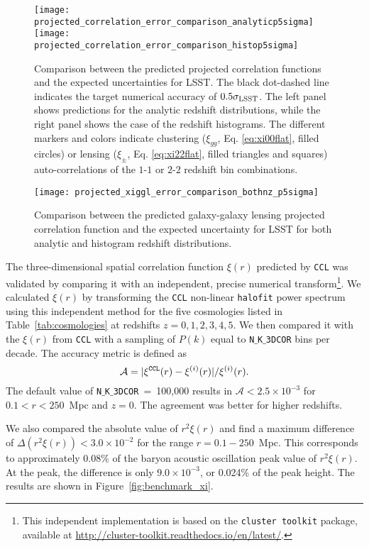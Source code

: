 \documentclass[\docopts]{\docclass}
\newcommand{\ccl}{{\tt CCL}\xspace}
\newcommand{\halofit}{{\tt halofit}\xspace}
\begin{document}
\begin{figure*}
\centering
\texttt{[image: projected\_correlation\_error\_comparison\_analyticp5sigma]} 
\texttt{[image: projected\_correlation\_error\_comparison\_histop5sigma]} 
\caption{Comparison between the predicted projected correlation functions and the expected uncertainties for LSST. The black dot-dashed line indicates the target numerical accuracy of $0.5\sigma_{\rm LSST}$. The left panel shows predictions for the analytic redshift distributions, while the right panel shows the case of the redshift histograms. The different markers and colors indicate clustering ($\xi_{gg}$, Eq. \ref{eq:xi00flat}, filled circles) or lensing ($\xi_{\pm}$, Eq. \ref{eq:xi22flat}, filled triangles and squares) auto-correlations of the $1$-$1$ or $2$-$2$ redshift bin combinations.}
\label{fig:corrval}
\end{figure*}
\begin{figure}
\centering
\texttt{[image: projected\_xiggl\_error\_comparison\_bothnz\_p5sigma]}
\caption{Comparison between the predicted galaxy-galaxy lensing projected correlation function and the expected uncertainty for LSST for both analytic and histogram redshift distributions.}
\label{fig:corrval2}
\end{figure}

The three-dimensional spatial correlation function $\xi(r)$ predicted by \ccl was validated by comparing it with an independent, precise numerical transform\footnote{This independent implementation is based on the {\tt cluster toolkit} package, available at \url{http://cluster-toolkit.readthedocs.io/en/latest/}.}. We calculated $\xi(r)$  by transforming the \ccl non-linear \halofit power spectrum using this independent method for the five cosmologies listed in Table~\ref{tab:cosmologies} at redshifts $z = 0,1,2,3,4,5$.  We then compared it with the $\xi(r)$ from \ccl with a sampling of $P(k)$ equal to {\tt N$\_$K$\_$3DCOR} bins per decade. The accuracy metric is defined as
\begin{equation}
	\mathcal{A}=|\xi^{\tt CCL}(r)-\xi^{(i)}(r)| / \xi^{(i)}(r).
  \label{eq:accxi}
\end{equation}
The default value of {\tt N$\_$K$\_$3DCOR}~=~100,000 results in $\mathcal{A} < 2.5 \times 10^{-3}$ for $0.1 < r < 250$~Mpc and $z=0$. The agreement was better for higher redshifts.

We also compared the absolute value of $r^2 \xi(r)$ and find a maximum difference of $\Delta (r^2 \xi(r)) < 3.0 \times 10^{-2}$ for the range $r = 0.1 - 250$~Mpc. This corresponds to approximately $0.08\%$ of the baryon acoustic oscillation peak value of $r^2 \xi(r)$. At the peak, the difference is only $9.0 \times 10^{-3}$, or 0.024\% of the peak height. The results are shown in Figure~\ref{fig:benchmark_xi}.
\end{document}
